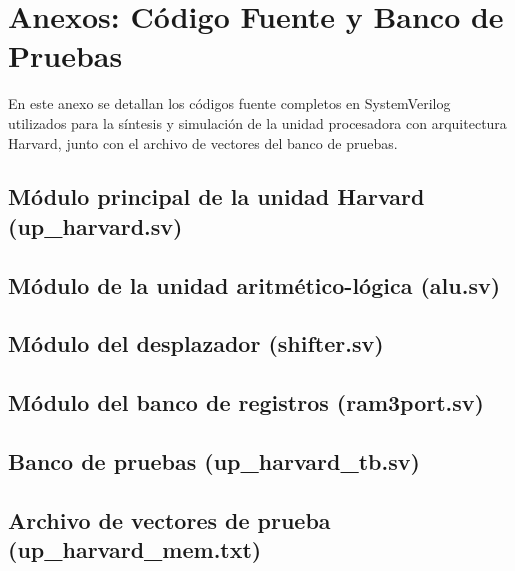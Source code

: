 \chapter{Anexos: Código Fuente y Banco de Pruebas}\label{sec.ej1:anexos}

En este anexo se detallan los códigos fuente completos en SystemVerilog utilizados para la síntesis y simulación de la
unidad procesadora con arquitectura Harvard, junto con el archivo de vectores del banco de pruebas.

\section{Módulo principal de la unidad Harvard (up\_harvard.sv)}


\section{Módulo de la unidad aritmético-lógica (alu.sv)}


\section{Módulo del desplazador (shifter.sv)}


\section{Módulo del banco de registros (ram3port.sv)}


\section{Banco de pruebas (up\_harvard\_tb.sv)}


\section{Archivo de vectores de prueba (up\_harvard\_mem.txt)}


